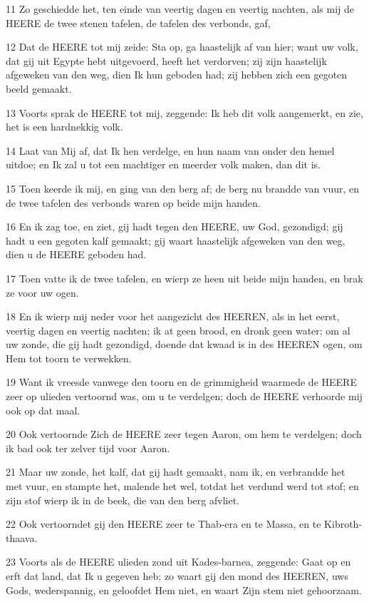 \par 11 Zo geschiedde het, ten einde van veertig dagen en veertig nachten, als mij de HEERE de twee stenen tafelen, de tafelen des verbonds, gaf,
\par 12 Dat de HEERE tot mij zeide: Sta op, ga haastelijk af van hier; want uw volk, dat gij uit Egypte hebt uitgevoerd, heeft het verdorven; zij zijn haastelijk afgeweken van den weg, dien Ik hun geboden had; zij hebben zich een gegoten beeld gemaakt.
\par 13 Voorts sprak de HEERE tot mij, zeggende: Ik heb dit volk aangemerkt, en zie, het is een hardnekkig volk.
\par 14 Laat van Mij af, dat Ik hen verdelge, en hun naam van onder den hemel uitdoe; en Ik zal u tot een machtiger en meerder volk maken, dan dit is.
\par 15 Toen keerde ik mij, en ging van den berg af; de berg nu brandde van vuur, en de twee tafelen des verbonds waren op beide mijn handen.
\par 16 En ik zag toe, en ziet, gij hadt tegen den HEERE, uw God, gezondigd; gij hadt u een gegoten kalf gemaakt; gij waart haastelijk afgeweken van den weg, dien u de HEERE geboden had.
\par 17 Toen vatte ik de twee tafelen, en wierp ze heen uit beide mijn handen, en brak ze voor uw ogen.
\par 18 En ik wierp mij neder voor het aangezicht des HEEREN, als in het eerst, veertig dagen en veertig nachten; ik at geen brood, en dronk geen water; om al uw zonde, die gij hadt gezondigd, doende dat kwaad is in des HEEREN ogen, om Hem tot toorn te verwekken.
\par 19 Want ik vreesde vanwege den toorn en de grimmigheid waarmede de HEERE zeer op ulieden vertoornd was, om u te verdelgen; doch de HEERE verhoorde mij ook op dat maal.
\par 20 Ook vertoornde Zich de HEERE zeer tegen Aaron, om hem te verdelgen; doch ik bad ook ter zelver tijd voor Aaron.
\par 21 Maar uw zonde, het kalf, dat gij hadt gemaakt, nam ik, en verbrandde het met vuur, en stampte het, malende het wel, totdat het verdund werd tot stof; en zijn stof wierp ik in de beek, die van den berg afvliet.
\par 22 Ook vertoorndet gij den HEERE zeer te Thab-era en te Massa, en te Kibroth-thaava.
\par 23 Voorts als de HEERE ulieden zond uit Kades-barnea, zeggende: Gaat op en erft dat land, dat Ik u gegeven heb; zo waart gij den mond des HEEREN, uws Gods, wederspannig, en geloofdet Hem niet, en waart Zijn stem niet gehoorzaam.
